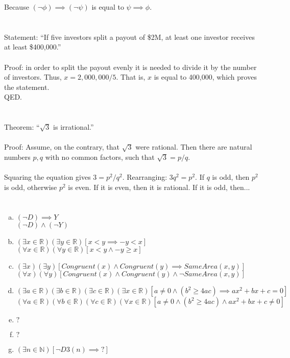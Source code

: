 \documentclass{article}
\begin{document}
Because $(\neg\phi) \implies (\neg\psi)$ is equal to $\psi \implies \phi$.

\section{}

Statement: ``If five investors split a payout of \$2M, at least one investor
receives at least \$400,000.''
\\\\
Proof: in order to split the payout evenly it is needed to divide it by the
number of investors. Thus, $x = 2,000,000 / 5$. That is, $x$ is equal to
400,000, which proves the statement.
\\
QED.

\section{}

Theorem: ``$\sqrt{3}$ is irrational.''
\\\\
Proof: Assume, on the contrary, that $\sqrt{3}$ were rational. Then there are
natural numbers $p, q$ with no common factors, such that $\sqrt{3} = p / q$.
\\
\\
Squaring the equation gives $3 = p^2 / q^2$. Rearranging: $3q^2 = p^2$. If $q$
is odd, then $p^2$ is odd, otherwise $p^2$ is even. If it is even, then it is
rational. If it is odd, then...

\section{}

\begin{enumerate}[(a)]
\item $(\neg D) \implies Y$\\
  $(\neg D) \wedge (\neg Y)$
\item $(\exists x \in \mathbb{R})(\exists y \in \mathbb{R})[x < y \implies -y < x]$\\
  $(\forall x \in \mathbb{R})(\forall y \in \mathbb{R})[x < y \wedge -y \geq x]$
\item $(\exists x)(\exists y)[Congruent(x) \wedge Congruent(y) \implies SameArea(x, y)]$\\
  $(\forall x)(\forall y)[Congruent(x) \wedge Congruent(y) \wedge \neg SameArea(x, y)]$
\item $(\exists a \in \mathbb{R})(\exists b \in \mathbb{R})(\exists c \in \mathbb{R})(\exists x \in \mathbb{R})[a \neq 0 \wedge (b^2 \geq 4ac) \implies ax^2 + bx + c = 0]$\\
  $(\forall a \in \mathbb{R})(\forall b \in \mathbb{R})(\forall c \in \mathbb{R})(\forall x \in \mathbb{R})[a \neq 0 \wedge (b^2 \geq 4ac) \wedge ax^2 + bx + c \neq 0]$
\item $?$
\item $?$
\item $(\exists n \in \mathbb{N})[\neg D3(n) \implies ?]$
\end{enumerate}
\end{document}
